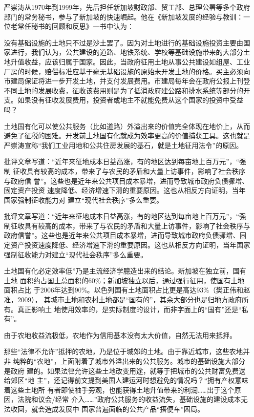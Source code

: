 严崇涛从1970年到1999年，先后担任新加坡财政部、贸工部、总理公署等多个政府部门的常务秘书，参与了新加坡的快速崛起。他在《新加坡发展的经验与教训：一位老常任秘书的回顾和反思》一书中认为：

没有基础设施的土地只不过是沙土罢了。因为对土地进行的基础设施投资主要由国家进行，我们认为，公共建设的道路、地铁系统、学校等基础设施带来的大部分土地升值收益，应该归属于国家。因此，当政府征用土地从事公共建设如组屋、工业厂房的时候，赔偿标准应基于毫无基础设施的原始未开发土地的价格。买主必须向市建局保证将进一步开发土地，并支付发展费用。市建局每年会在政府公报上刊登不同土地的发展收费，征收该费用则是为了抵消政府建公路和排水系统等部分的开支。如果没有征收发展费用，投资者或地主不就能免费从这个国家的投资中受益吗？

土地国有化可以使公共服务（比如道路）外溢出来的价值完全体现在地价上，从而避免了征税的困难。开发前土地国有化就成为效率更高的价值捕获工具。这也就是严崇涛宣称“我们工业用地和公共住房发展的基石，就是土地征用法令”的原因。

批评文章写道：“近年来征地成本日益高涨，有的地区达到每亩地上百万元”，“强制
征收具有较高的成本，带来了与农民的矛盾和大量上访事件，影响了社会秩序与政府信
誉”。这些也是近年来公共项目成本暴增，进而导致城市政府负债骤增、固定资产投资
速度降低、经济增速下滑的重要原因。这也从相反方向证明，当年国家强制征收能力对
建立“现代社会秩序”多么重要。

批评文章写道：“近年来征地成本日益高涨，有的地区达到每亩地上百万元”，“强制征收具有较高的成本，带来了与农民的矛盾和大量上访事件，影响了社会秩序与政府信誉”。这些也是近年来公共项目成本暴增，进而导致城市政府负债骤增、固定资产投资速度降低、经济增速下滑的重要原因。这也从相反方向证明，当年国家强制征收能力对建立“现代社会秩序”多么重要。

土地国有化必定效率低”乃是主流经济学臆造出来的结论。新加坡在独立前，国有土地
面积约占国土总面积的60\%；新加坡独立以后，通过强行征用，使国有土地面积占比
于2006年达到90\%。以色列国有土地面积占比更是高达93\%（樊正伟和赵准，2009），
其城市土地和农村土地都是“国有的”，其余大部分也是归地方政府所有。真正影响土
地使用效率的，是实际制度的设计，而非字面上的“国有”还是“私有”。


由于农地收益流极低，农地作为信用基本没有太大价值，自然无法用来抵押。

那些“法律不允许”抵押的农地，乃是位于城郊的土地。由于靠近城市，这些农地并非
纯粹的“农地”，上面附着了城市外溢出来的公共服务。城市的基础设施大部分是政府
建的。如果法律允许这些土地改变用途，就等于把城市的公共财富免费送给郊区“地
主”，还记得前文提到美国人建运河时想避免的情况吗？“拥有产权意味着这些土地所
有者即使袖手旁观，也能获得土地升值带来的利润……出于这个原因，法院和议会/经常
介入……”政府公共服务的收益流失，基础设施的建设成本无法收回，就会造成发展中
国家普遍面临的公共产品“搭便车”困局。

